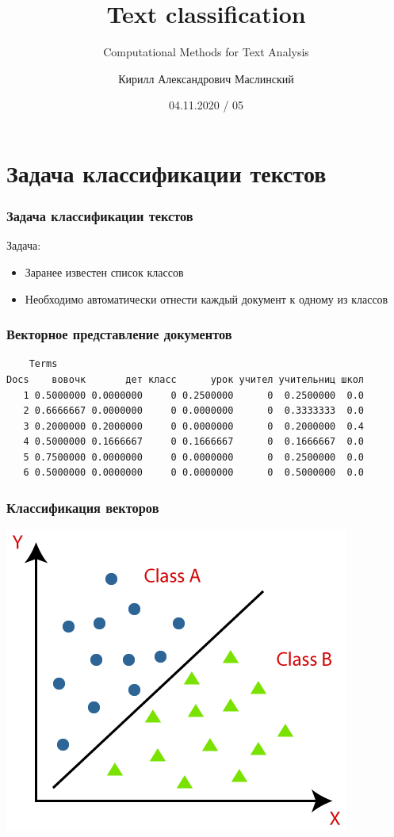 \documentclass[svgnames]{beamer}
\title[CMTA 05] %
{Text classification}
\subtitle
{Computational Methods for Text Analysis} %
\author%
{Кирилл Александрович Маслинский}
\institute%
{НИУ ВШЭ Санкт-Петербург}
\date%
{04.11.2020 / 05}
\begin{document}
\begin{frame}
  \titlepage
\end{frame}

\section{Задача классификации текстов}

\begin{frame}
  \frametitle{Задача классификации текстов}
  Задача:
  \begin{itemize}
  \item Заранее известен список \alert{классов}
  \item Необходимо автоматически отнести каждый документ к одному из классов
  \end{itemize}
\end{frame}

\begin{frame}[fragile]
  \frametitle{Векторное представление документов}
  \begin{verbatim}
    Terms
Docs    вовочк       дет класс      урок учител учительниц школ
   1 0.5000000 0.0000000     0 0.2500000      0  0.2500000  0.0
   2 0.6666667 0.0000000     0 0.0000000      0  0.3333333  0.0
   3 0.2000000 0.2000000     0 0.0000000      0  0.2000000  0.4
   4 0.5000000 0.1666667     0 0.1666667      0  0.1666667  0.0
   5 0.7500000 0.0000000     0 0.0000000      0  0.2500000  0.0
   6 0.5000000 0.0000000     0 0.0000000      0  0.5000000  0.0
\end{verbatim}
\end{frame}

\begin{frame}
  \frametitle{Классификация векторов}
  \centering
  \includegraphics[height=.8\textheight]{classification-algorithm-in-machine-learning}
\end{frame}
\end{document}
